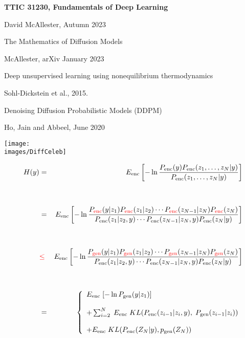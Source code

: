 





{\Huge

  \centerline{\bf TTIC 31230, Fundamentals of Deep Learning}
  \bigskip
  \centerline{David McAllester, Autumn 2023}
  \vfill
  \vfil
  \centerline{The Mathematics of Diffusion Models}
  \vfill
  \centerline{McAllester, arXiv January 2023}
    \vfill
  \vfill


\centerline{Deep unsupervised learning using nonequilibrium thermodynamics}
\centerline{Sohl-Dickstein et al., 2015.}

\vfill
\centerline{Denoising Diffusion Probabilistic Models (DDPM)}
\centerline{Ho, Jain and Abbeel, June 2020}


\vfill
\centerline{\texttt{[image: \\images/DiffCeleb]}}


{\Large
\begin{eqnarray*}
H(y) & = & E_{\mathrm{enc}}\left[- \ln\frac{P_{\mathrm{enc}}(y)P_{\mathrm{enc}}(z_1,\ldots,z_N|y)}{P_{\mathrm{enc}}(z_1,\ldots,z_N|y)}\right]\\
  \\
  \\
  & = & E_{\mathrm{enc}}\left[ - \ln\frac{P_{\color{red} \mathrm{enc}}(y|z_1)P_{\color{red} \mathrm{enc}}(z_1|z_2)\cdots P_{\color{red} \mathrm{enc}}(z_{N-1}|z_N)P_{\color{red} \mathrm{enc}}(z_N)}
  {P_{\mathrm{enc}}(z_1|z_2,y)\cdots P_{\mathrm{enc}}(z_{N-1}|z_N,y)P_{\mathrm{enc}}(z_N|y)}\right] \\
   \\
   \\
  & {\color{red} \leq} & E_{\mathrm{enc}}\left[ - \ln\frac{P_{\color{red} \mathrm{gen}}(y|z_1)P_{\color{red} \mathrm{gen}}(z_1|z_2)\cdots P_{\color{red} \mathrm{gen}}(z_{N-1}|z_N)P_{\color{red} \mathrm{gen}}(z_N)}
  {P_{\mathrm{enc}}(z_1|z_2,y)\cdots P_{\mathrm{enc}}(z_{N-1}|z_N,y)P_{\mathrm{enc}}(z_N|y)}\right] \\
\\
\\
 & = & \left\{\begin{array}{l}E_{\mathrm{enc}}\;[-\ln P_{\mathrm{gen}}(y|z_1)]
                             \\ \\ + \sum_{i=2}^N  \; E_{\mathrm{enc}}\; KL(P_{\mathrm{enc}}(z_{i-1}|z_i,y),\;P_{\mathrm{gen}}(z_{i-1}|z_i)) \\
                             \\ + E_{\mathrm{enc}}\; KL(P_{\mathrm{enc}}(Z_N|y),p_{\mathrm{gen}}(Z_N))\end{array}\right.
\end{eqnarray*}
}

}
